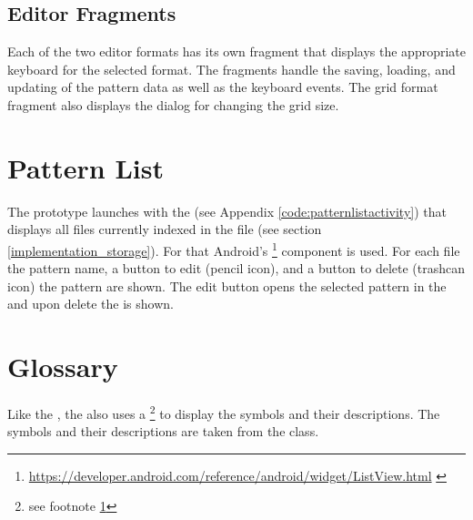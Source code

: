 \subsection*{Editor Fragments}
Each of the two editor formats has its own fragment that displays the appropriate keyboard for the selected format. The fragments handle the saving, loading, and updating of the pattern data as well as the keyboard events. The grid format fragment also displays the dialog for changing the grid size.

\section{Pattern List}
The prototype launches with the  (see Appendix \ref{code:patternlistactivity}) that displays all files currently indexed in the  file (see section \ref{implementation_storage}). For that Android's \footnote{\url{https://developer.android.com/reference/android/widget/ListView.html} \label{url_footnote}} component is used. For each file the pattern name, a button to edit (pencil icon), and a button to delete (trashcan icon) the pattern are shown. The edit button opens the selected pattern in the  and upon delete the  is shown.

\section{Glossary}
Like the , the  also uses a \footnote{see footnote \ref{url_footnote}} to display the symbols and their descriptions. The symbols and their descriptions are taken from the  class.

